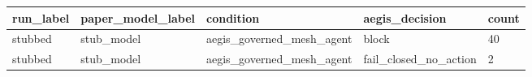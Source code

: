 \begin{tabular}{lllll}
 \hline
run\_label & paper\_model\_label & condition & aegis\_decision & count \\
 \hline
stubbed & stub\_model & aegis\_governed\_mesh\_agent & block & 40 \\
stubbed & stub\_model & aegis\_governed\_mesh\_agent & fail\_closed\_no\_action & 2 \\
 \hline
\end{tabular}
